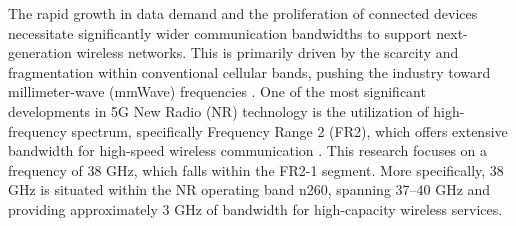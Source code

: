 The rapid growth in data demand and the proliferation of connected devices necessitate significantly wider communication bandwidths to support next-generation wireless networks. This is primarily driven by the scarcity and fragmentation within conventional cellular bands, pushing the industry toward millimeter-wave (mmWave) frequencies \cite{Rappaport2013}. One of the most significant developments in 5G New Radio (NR) technology is the utilization of high-frequency spectrum, specifically Frequency Range 2 (FR2), which offers extensive bandwidth for high-speed wireless communication \cite{TSGR2021}. This research focuses on a frequency of 38 GHz, which falls within the FR2-1 segment. More specifically, 38 GHz is situated within the NR operating band n260, spanning 37–40 GHz and providing approximately 3 GHz of bandwidth for high-capacity wireless services.


